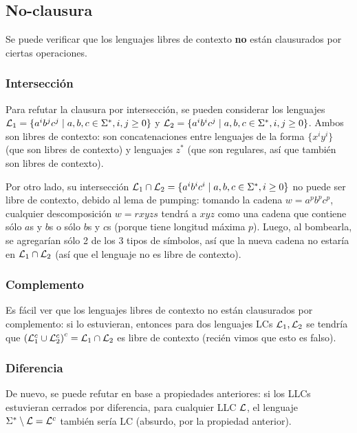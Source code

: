 \subsection{No-clausura}

Se puede verificar que los lenguajes libres de contexto \textbf{no} están clausurados por ciertas operaciones.

\subsubsection{Intersección}

Para refutar la clausura por intersección, se pueden considerar los lenguajes $\mathcal{L}_1 = \{a^i b^j c^j \mid a,b,c \in \Sigma^*, i,j \geq 0\}$ y $\mathcal{L}_2 = \{a^i b^i c^j \mid a,b,c \in \Sigma^*, i,j \geq 0\}$. Ambos son libres de contexto: son concatenaciones entre lenguajes de la forma $\{x^i y^i\}$ (que son libres de contexto) y lenguajes $z^*$ (que son regulares, así que también son libres de contexto).

Por otro lado, su intersección $\mathcal{L}_1 \cap \mathcal{L}_2 = \{a^i b^i c^i \mid a,b,c \in \Sigma^*, i \geq 0\}$ no puede ser libre de contexto, debido al lema de pumping: tomando la cadena $w = a^p b^p c^p$, cualquier descomposición $w = rxyzs$ tendrá a $xyz$ como una cadena que contiene sólo $a$s y $b$s o sólo $b$s y $c$s (porque tiene longitud máxima $p$). Luego, al bombearla, se agregarían sólo 2 de los 3 tipos de símbolos, así que la nueva cadena no estaría en $\mathcal{L}_1 \cap \mathcal{L}_2$ (así que el lenguaje no es libre de contexto).

\subsubsection{Complemento}

Es fácil ver que los lenguajes libres de contexto no están clausurados por complemento: si lo estuvieran, entonces para dos lenguajes LCs $\mathcal{L}_1, \mathcal{L}_2$ se tendría que $\left(\mathcal{L}_1^c \cup \mathcal{L}_2^c\right)^c = \mathcal{L}_1 \cap \mathcal{L}_2$ es libre de contexto (recién vimos que esto es falso).

\subsubsection{Diferencia}

De nuevo, se puede refutar en base a propiedades anteriores: si los LLCs estuvieran cerrados por diferencia, para cualquier LLC $\mathcal{L}$, el lenguaje $\Sigma^* \setminus \mathcal{L} = \mathcal{L}^c$ también sería LC (absurdo, por la propiedad anterior).
